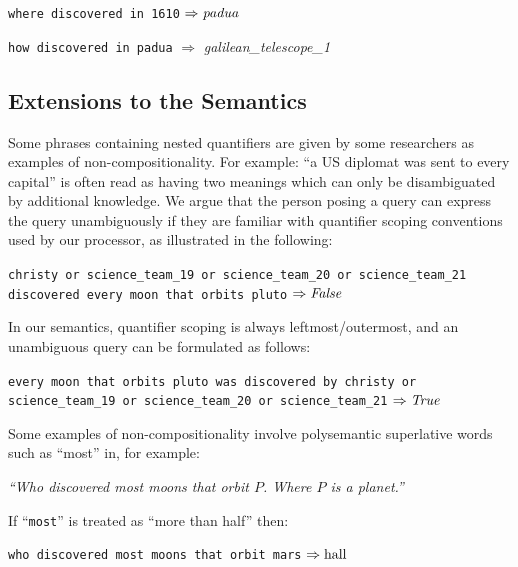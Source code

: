 \documentclass[../main.tex]{subfiles}
\begin{document}
\begin{refsection}
\examplespacing

\texttt{where discovered in 1610} $\Rightarrow \operatorname{\mathit{padua}}$

\texttt{how discovered in padua} $\Rightarrow$ \textit{galilean\_telescope\_1}

\subsection{Extensions to the Semantics}
\label{webist2019journal:extend}

Some phrases containing nested quantifiers are given by some researchers as examples of non-compositionality. For example: ``a US diplomat was sent to every capital'' is often read as having two meanings which can only be disambiguated by additional knowledge. We argue that the person posing a query can express the query unambiguously if they are familiar with quantifier scoping conventions used by our processor, as illustrated in the following:

\examplespacing

\texttt{christy or science\_team\_19 or science\_team\_20 or science\_team\_21 \linebreak discovered every moon that orbits pluto} $\Rightarrow \operatorname{\mathit{False}}$

\examplespacing

\noindent In our semantics, quantifier scoping is always leftmost/outermost, and an unambiguous query can be formulated as follows:

\examplespacing

\texttt{every moon that orbits pluto was discovered by christy or \linebreak science\_team\_19 or science\_team\_20 or science\_team\_21} $\Rightarrow \operatorname{\mathit{True}}$

\examplespacing

\noindent Some examples of non-compositionality involve polysemantic superlative words such as ``most'' in, for example:
\begin{center}
	\vspace{-0.25em}
	\textit{``Who discovered most moons that orbit $P$. Where $P$ is a planet.''}
	\vspace{-0.25em}
\end{center}
If ``\texttt{most}'' is treated as ``more than half'' then:

\examplespacing

\texttt{who discovered most moons that orbit mars} $\Rightarrow \operatorname{hall}$


\end{refsection}
\end{document}

